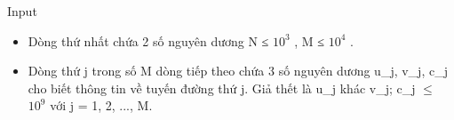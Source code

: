 Input
\begin{itemize}
	\item     Dòng thứ nhất chứa 2 số nguyên dương N ≤ $10^{3}$    , M         ≤ $10^{4}$     .    
	\item      Dòng thứ j trong số M dòng tiếp theo chứa 3 số nguyên dương u\_j, v\_j, c\_j cho biết thông tin về tuyến đường thứ j. Giả thết là u\_j khác v\_j; c\_j  $\le$  $10^{9}$     với j = 1, 2, ..., M.    
\end{itemize}